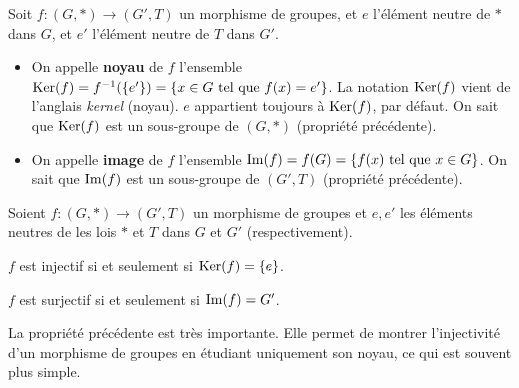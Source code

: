 \documentclass[12pt, a4paper]{report}
\begin{document}
\begin{definition}
    Soit $f:(G,*)\to(G',T)$ un morphisme de groupes, et $e$ l'élément neutre de $*$ dans $G$, et $e'$ l'élément neutre de $T$ dans $G'$.

    \begin{itemize}
        \item On appelle \textbf{noyau} de $f$ l'ensemble $\mathrm{Ker}(f) = f^{-1}(\{e'\}) = \{x \in G \text{ tel que } f(x) = e'\}$. La notation $\mathrm{Ker}(f)$ vient de l'anglais \textit{kernel} (noyau). $e$ appartient toujours à $\mathrm{Ker}(f)$, par défaut. On sait que $\mathrm{Ker}(f)$ est un sous-groupe de $(G,*)$ (propriété précédente).
        \item On appelle \textbf{image} de $f$ l'ensemble $\mathrm{Im}(f) = f(G) = \{f(x) \text{ tel que } x \in G\}$. On sait que $\mathrm{Im}(f)$ est un sous-groupe de $(G',T)$ (propriété précédente).
    \end{itemize}
\end{definition}

\begin{property}
    Soient $f:(G,*)\to(G',T)$ un morphisme de groupes et $e, e'$ les éléments neutres de les lois $*$ et $T$ dans $G$ et $G'$ (respectivement).
    
    $f$ est injectif si et seulement si $\mathrm{Ker}(f) = \{e\}$.

    $f$ est surjectif si et seulement si $\mathrm{Im}(f) = G'$.
\end{property}

\begin{attention}
    La propriété précédente est très importante. Elle permet de montrer l'injectivité d'un morphisme de groupes en étudiant uniquement son noyau, ce qui est souvent plus simple.
\end{attention}
\end{document}
